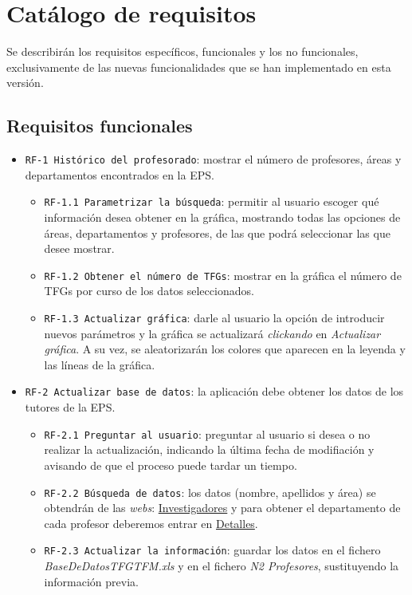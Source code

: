 \section{Catálogo de requisitos}
Se describirán los requisitos específicos, funcionales y los no funcionales, exclusivamente de las nuevas funcionalidades que se han implementado en esta versión.
\subsection{Requisitos funcionales}
\begin{itemize}
		\item \texttt{RF-1  Histórico del profesorado}: mostrar el número de profesores, áreas y departamentos encontrados en la EPS.
		\begin{itemize}
			\item \texttt{RF-1.1 Parametrizar la búsqueda}: permitir al usuario escoger qué información desea obtener en la gráfica, mostrando todas las opciones de áreas, departamentos y profesores, de las que podrá seleccionar las que desee mostrar.
			\item \texttt{RF-1.2 Obtener el número de TFGs}: mostrar en la gráfica el número de TFGs por curso de los datos seleccionados.
			\item \texttt{RF-1.3 Actualizar gráfica}: darle al usuario la opción de introducir nuevos parámetros y la gráfica se actualizará \emph{clickando} en \emph{Actualizar gráfica}. A su vez, se aleatorizarán los colores que aparecen en la leyenda y las líneas de la gráfica.
		\end{itemize}
		\item \texttt{RF-2 Actualizar base de datos}: la aplicación debe obtener los datos de los tutores de la EPS.
		\begin{itemize}
				\item \texttt{RF-2.1 Preguntar al usuario}: preguntar al usuario si desea o no realizar la actualización, indicando la última fecha de modifiación y avisando de que el proceso puede tardar un tiempo.
				\item \texttt{RF-2.2 Búsqueda de datos}: los datos (nombre, apellidos y área) se obtendrán de las \emph{webs}: \href{https://investigacion.ubu.es/unidades/2682/investigadores}{Investigadores} y para obtener el departamento de cada profesor deberemos entrar en \href{https://investigacion.ubu.es/investigadores/34937/detalle}{Detalles}.
				\item \texttt{RF-2.3 Actualizar la información}: guardar los datos en el fichero \emph{BaseDeDatosTFGTFM.xls} y en el fichero \emph{N2 Profesores}, sustituyendo la información previa.				
		\end{itemize}
				

\end{itemize}
